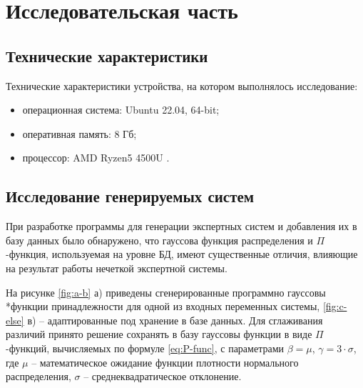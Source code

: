 \section{Исследовательская часть}

\subsection{Технические характеристики}
Технические характеристики устройства, на котором выполнялось исследование:
\begin{itemize}
	\item операционная система: Ubuntu 22.04, 64-bit;
	\item оперативная память: 8 Гб;
	\item процессор: AMD Ryzen5 4500U \cite{proc}.
\end{itemize}

\subsection{Исследование генерируемых систем}
При разработке программы для генерации экспертных систем и добавления их в базу данных было обнаружено, что гауссова функция распределения и $\Pi$-функция, используемая на уровне БД, имеют существенные отличия, влияющие на результат работы нечеткой экспертной системы. 

На рисунке \ref{fig:a-b} а) приведены сгенерированные программно гауссовы \\*функции принадлежности для одной из входных переменных системы, \ref{fig:c-else} в) -- адаптированные под хранение в базе данных. Для сглаживания различий принято решение сохранять в базу гауссовы функции в виде $\Pi$-функций, вычисляемых по формуле \ref{eq:P-func}, с параметрами $\beta = \mu$, $\gamma = 3 \cdot \sigma$, где $\mu$ -- математическое ожидание функции плотности нормального распределения, $\sigma$ -- среднеквадратическое отклонение. 

